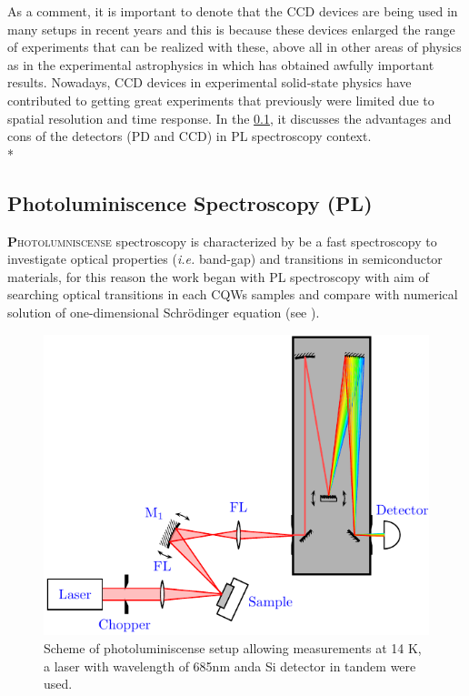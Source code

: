 As a comment, it is important to denote that the CCD devices are being used in many setups in recent years and this is because these devices enlarged the range of experiments that can be realized with these, above all in other areas of physics as in the experimental astrophysics in which has obtained awfully important results.  Nowadays, CCD devices in experimental solid-state physics have contributed to getting great experiments that previously were limited due to spatial resolution and time response.  In the \cref{subsec:chapter-3-pl}, it discusses the advantages and cons of the detectors (PD and CCD)  in PL spectroscopy context. \\*

\subsection{Photoluminiscence Spectroscopy (PL)}
\label{subsec:chapter-3-pl}
\vspace{-10mm}
\lettrine[lines=3, lraise=.1, nindent=0mm, slope=0mm]{\textbf{P}}{hotolumniscense} spectroscopy is characterized by be a fast spectroscopy to investigate optical properties (\textit{i.e.} band-gap) and transitions in  semiconductor materials, for this reason the work began with PL spectroscopy with aim of searching optical transitions in each CQWs samples and compare with  numerical solution of one-dimensional Schr\"{o}dinger equation (see ). 
\begin{figure}[h!]
	\centering
	\includegraphics[width=\textwidth]{../figures/chapter-3/pl-setup/build-ruco/pl-setup}
	\caption[PL Scheme]{Scheme of photoluminiscense setup allowing measurements at 14 K, a laser with wavelength of 685nm anda Si detector in tandem were used.}
	\label{fig:chapter-3 subsec 3.2.1 PL setup}
\end{figure}

